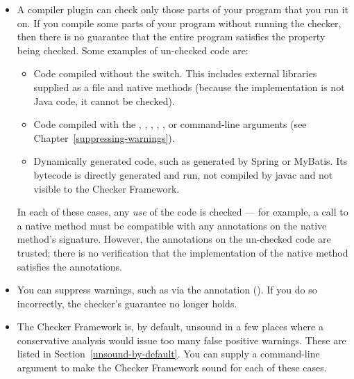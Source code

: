 \begin{itemize}

\item
  A compiler plugin can check only those parts of your program that you run
  it on.  If you compile some parts of your program without running the
  checker, then there is no guarantee that the entire program satisfies the
  property being checked.  Some examples of un-checked code are:

  \begin{itemize}
  \item
    Code compiled without the  switch.  This includes
    external libraries supplied as a  file and native methods
    (because the implementation is not Java code, it cannot be checked).
  \item
    Code compiled with the , ,
    , , , or
    command-line arguments (see Chapter~\ref{suppressing-warnings}).
  \item
    Dynamically generated code, such as generated by Spring or MyBatis.
    Its bytecode is directly generated and run, not compiled by javac and
    not visible to the Checker Framework.
  \end{itemize}

  In each of these cases, any \emph{use} of the code is checked --- for
  example, a call to a native method must be compatible with any
  annotations on the native method's signature.
  However, the annotations on the un-checked code are trusted; there is no
  verification that the implementation of the native method satisfies the
  annotations.

\item
  You can suppress warnings, such as via the 
  annotation ().  If you do so
  incorrectly, the checker's guarantee no longer holds.

\item
  The Checker Framework is, by default, unsound in a few places where a
  conservative analysis would issue too many false positive warnings.
  These are listed in Section~\ref{unsound-by-default}.
  You can supply a command-line argument to make the Checker Framework
  sound for each of these cases.



\end{itemize}

